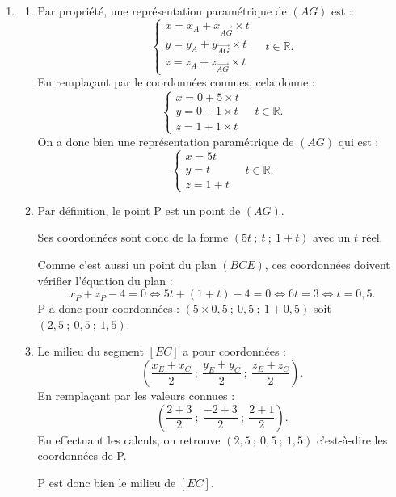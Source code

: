 \documentclass[10pt]{article}
\providecommand{\R}{\mathbb{R}}
\providecommand{\vect}[1]{\overrightarrow{#1}}
\begin{document}
\begin{enumerate}
\item \begin{enumerate}
\item Par propriété, une représentation paramétrique de $(AG)$ est :
\[
\begin{cases}
x=x_A+x_{\vect{AG}}\times t\\
y=y_A+y_{\vect{AG}}\times t\\
z=z_A+z_{\vect{AG}}\times t
\end{cases}\quad t\in\R.
\]
En remplaçant par le coordonnées connues, cela donne :
\[
\begin{cases}
x=0+5\times t\\
y=0+1\times t\\
z=1+1\times t
\end{cases}\quad t\in\R.
\]
On a donc bien une représentation paramétrique de $(AG)$ qui est :
\[
\begin{cases}
x=5t\\
y=t\\
z=1+t
\end{cases}\quad t\in\R.
\]

\item Par définition, le point P est un point de $(AG)$.

Ses coordonnées sont donc de la forme $(5t~;~t~;~1+t)$ avec un $t$ réel.

Comme c'est aussi un point du plan $(BCE)$, ces coordonnées doivent vérifier l'équation du plan :
\[
x_P+z_P-4=0\Longleftrightarrow 5t+(1+t)-4=0
\Longleftrightarrow 6t=3
\Longleftrightarrow t=0,5.
\]
P a donc pour coordonnées : $(5\times 0,5~;~0,5~;~1+0,5)$ soit $(2,5~;~0,5~;~1,5)$.

\item Le milieu du segment $[EC]$ a pour coordonnées :
\[
\left(\dfrac{x_E+x_C}{2}~;~\dfrac{y_E+y_C}{2}~;~\dfrac{z_E+z_C}{2}\right).
\]
En remplaçant par les valeurs connues :
\[
\left(\dfrac{2+3}{2}~;~\dfrac{-2+3}{2}~;~\dfrac{2+1}{2}\right).
\]
En effectuant les calculs, on retrouve $(2,5~;~0,5~;~1,5)$ c'est-à-dire les coordonnées de P.

P est donc bien le milieu de $[EC]$.
\end{enumerate}


\end{enumerate}
\end{document}
